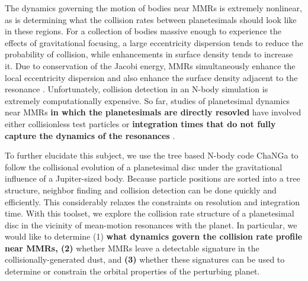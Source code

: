\documentclass[fleqn,usenatbib]{mnras}
\begin{document}
The dynamics governing the motion of bodies near MMRs is extremely nonlinear, as is determining what the collision rates between planetesimals 
should look like in these regions. For a collection of bodies massive enough to experience the effects of gravitational focusing, a large eccentricity 
dispersion tends to reduce the probability of collision, while enhancements in surface density tends to increase it. Due to conservation of the Jacobi 
energy, MMRs simultaneously enhance the local eccentricity dispersion and also enhance the surface density adjacent to the resonance 
\citep{2000Icar..143...45R, 2017ApJ...850..103B}. Unfortunately, collision detection in an N-body simulation is extremely computationally expensive. 
So far, studies of planetesimal dynamics near MMRs \textbf{in which the planetesimals are directly resovled} have involved either collisionless test particles 
\citep{2017ApJ...850..103B, 2016ApJ...818..159T, 2018ApJ...857....3T} or \textbf{integration times that do not fully capture the dynamics of the resonances} \citep{2000Icar..143...45R, 2013ApJ...777L..31D}.

To further elucidate this subject, we use the tree based N-body code {\sc ChaNGa}\citep{2008IEEEpds...ChaNGa, 2015AphCom..2..1}  to follow the 
collisional evolution of a planetesimal disc under the gravitational influence of a Jupiter-sized body. Because particle positions are sorted into a tree 
structure, neighbor finding and collision detection can be done quickly and efficiently. This considerably relaxes the constraints on resolution and 
integration time. With this toolset, we explore the collision rate structure of a planetesimal disc in the vicinity of mean-motion resonances with the planet. In 
particular, we would like to determine (1) \textbf{what dynamics govern the collision rate profile near MMRs, (2)} whether MMRs leave a detectable signature in the collisionally-generated dust, and \textbf{(3)} whether these 
signatures can be used to determine or constrain the orbital properties of the perturbing planet.
\end{document}

